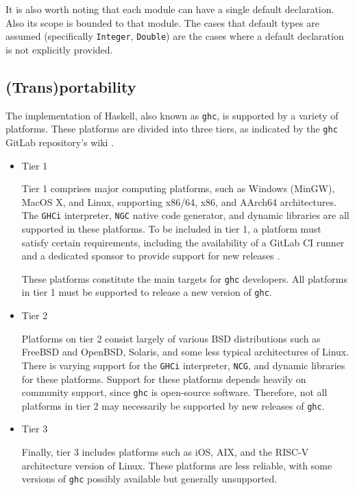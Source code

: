 \documentclass[a4paper, titlepage, twoside]{article}
\begin{document}
It is also worth noting that each module can have a single default declaration. Also its scope is bounded to that module. The cases that default types are assumed (specifically \texttt{Integer}, \texttt{Double}) are the cases where a default declaration is not explicitly provided.

\subsection{(Trans)portability}
\label{sec:orgf99eed4}

The implementation of Haskell, also known as \texttt{ghc}, is supported by a variety of platforms. These platforms are divided into three tiers, as indicated by the \texttt{ghc} GitLab repository's wiki \autocite{gamariPlatformsGlasgowHaskell2023}.

\begin{itemize}
\item Tier 1

Tier 1 comprises major computing platforms, such as Windows (MinGW), MacOS X, and Linux, supporting x86/64, x86, and AArch64 architectures. The \texttt{GHCi} interpreter, \texttt{NGC} native code generator, and dynamic libraries are all supported in these platforms. To be included in tier 1, a platform must satisfy certain requirements, including the availability of a GitLab CI runner and a dedicated sponsor to provide support for new releases \autocite{gamariPlatformsGlasgowHaskell2023}.

These platforms constitute the main targets for \texttt{ghc} developers. All platforms in tier 1 must be supported to release a new version of \texttt{ghc}.

\item Tier 2

Platforms on tier 2 consist largely of various BSD distributions such as FreeBSD and OpenBSD, Solaris, and some less typical architectures of Linux. There is varying support for the \texttt{GHCi} interpreter, \texttt{NCG}, and dynamic libraries for these platforms. Support for these platforms depends heavily on community support, since \texttt{ghc} is open-source software. Therefore, not all platforms in tier 2 may necessarily be supported by new releases of \texttt{ghc}.

\item Tier 3

Finally, tier 3 includes platforms such as iOS, AIX, and the RISC-V architecture version of Linux. These platforms are less reliable, with some versions of \texttt{ghc} possibly available but generally unsupported.
\end{itemize}
\end{document}
